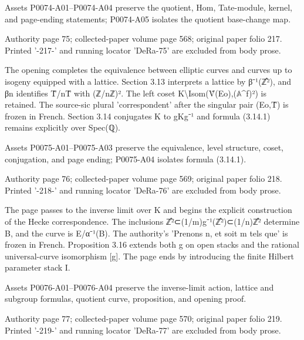 \documentclass[11pt,a4paper]{article}
\begin{document}
Assets P0074-A01--P0074-A04 preserve the quotient, Hom, Tate-module, kernel, and page-ending statements; P0074-A05 isolates the quotient base-change map.


\par\medskip
\hypertarget{D018-P0075}{}
\par\smallskip
Authority page 75; collected-paper volume page 568; original paper folio 217. Printed '-217-' and running locator 'DeRa-75' are excluded from body prose.

The opening completes the equivalence between elliptic curves and curves up to isogeny equipped with a lattice. Section 3.13 interprets a lattice by β⁻¹(ℤ̂²), and β\textunderscore{}n identifies T̂/nT̂ with (ℤ/nℤ)². The left coset K\textbackslash{}Isom(V̂(E\textunderscore{}o),(\ensuremath{\mathbb{A}}\textasciicircum{}f)²) is retained. The source-sic plural 'correspondent' after the singular pair (E\textunderscore{}o,T̂) is frozen in French. Section 3.14 conjugates K to gKg⁻¹ and formula (3.14.1) remains explicitly over Spec(ℚ).

Assets P0075-A01--P0075-A03 preserve the equivalence, level structure, coset, conjugation, and page ending; P0075-A04 isolates formula (3.14.1).


\par\medskip
\hypertarget{D018-P0076}{}
\par\smallskip
Authority page 76; collected-paper volume page 569; original paper folio 218. Printed '-218-' and running locator 'DeRa-76' are excluded from body prose.

The page passes to the inverse limit over K and begins the explicit construction of the Hecke correspondence. The inclusions ℤ̂²⊂(1/m)g⁻¹(ℤ̂²)⊂(1/n)ℤ̂² determine B, and the curve is E/α⁻¹(B). The authority's 'Prenons n, et soit m tels que' is frozen in French. Proposition 3.16 extends both g on open stacks and the rational universal-curve isomorphism [g]. The page ends by introducing the finite Hilbert parameter stack I.

Assets P0076-A01--P0076-A04 preserve the inverse-limit action, lattice and subgroup formulas, quotient curve, proposition, and opening proof.


\par\medskip
\hypertarget{D018-P0077}{}
\par\smallskip
Authority page 77; collected-paper volume page 570; original paper folio 219. Printed '-219-' and running locator 'DeRa-77' are excluded from body prose.
\end{document}
